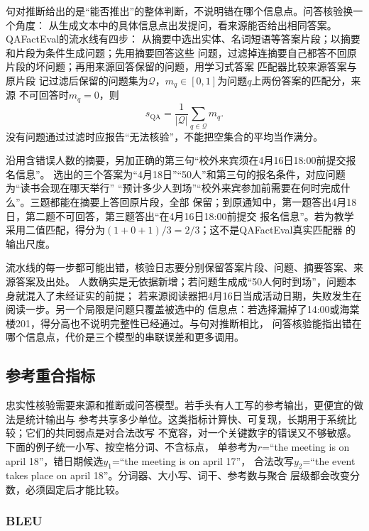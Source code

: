 句对推断给出的是“能否推出”的整体判断，不说明错在哪个信息点。问答核验换一个角度：
从生成文本中的具体信息点出发提问，看来源能否给出相同答案。QAFactEval的流水线有四步：
从摘要中选出实体、名词短语等答案片段；以摘要和片段为条件生成问题；先用摘要回答这些
问题，过滤掉连摘要自己都答不回原片段的坏问题；再用来源回答保留的问题，用学习式答案
匹配器比较来源答案与原片段
记过滤后保留的问题集为$\mathcal Q$，$m_q\in[0,1]$为问题$q$上两份答案的匹配分，来源
不可回答时$m_q=0$，则
\begin{equation}
  s_{\mathrm{QA}}=\frac{1}{|\mathcal Q|}\sum_{q\in\mathcal Q}m_q .
  \label{eq:nlp-generation-qafacteval}
\end{equation}
没有问题通过过滤时应报告“无法核验”，不能把空集合的平均当作满分。

沿用含错误人数的摘要，另加正确的第三句“校外来宾须在4月16日18:00前提交报名信息”。
选出的三个答案为“4月18日”“50人”和第三句的报名条件，对应问题为“读书会现在哪天举行”
“预计多少人到场”“校外来宾参加前需要在何时完成什么”。三题都能在摘要上答回原片段，全部
保留；到原通知中，第一题答出4月18日，第二题不可回答，第三题答出“在4月16日18:00前提交
报名信息”。若为教学采用二值匹配，得分为$(1+0+1)/3=2/3$；这不是QAFactEval真实匹配器
的输出尺度。

流水线的每一步都可能出错，核验日志要分别保留答案片段、问题、摘要答案、来源答案及出处。
人数确实是无依据新增；若问题生成成“50人何时到场”，问题本身就混入了未经证实的前提；
若来源阅读器把4月16日当成活动日期，失败发生在阅读一步。另一个局限是问题只覆盖被选中的
信息点：若选择漏掉了14:00或海棠楼201，得分高也不说明完整性已经通过。与句对推断相比，
问答核验能指出错在哪个信息点，代价是三个模型的串联误差和更多调用。

\subsection{参考重合指标}
\label{sec:nlp-generation-overlap}

忠实性核验需要来源和推断或问答模型。若手头有人工写的参考输出，更便宜的做法是统计输出与
参考共享多少单位。这类指标计算快、可复现，长期用于系统比较；它们的共同弱点是对合法改写
不宽容，对一个关键数字的错误又不够敏感。下面的例子统一小写、按空格分词、不含标点，
单参考为$r$=“the meeting is on april 18”，错日期候选$y_1$=“the meeting is on april 17”，
合法改写$y_2$=“the event takes place on april 18”。分词器、大小写、词干、参考数与聚合
层级都会改变分数，必须固定后才能比较。

\subsubsection{BLEU}
\label{sec:nlp-generation-bleu}

